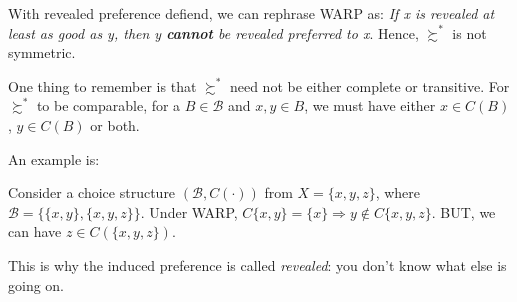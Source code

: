 With revealed preference defiend, we can rephrase WARP as: \textit{If x is revealed at least as good as y, then y \textbf{cannot} be revealed preferred to x}. Hence, $\succsim^*$ is not symmetric.

One thing to remember is that $\succsim^*$ need not be either complete or transitive. For $\succsim^*$ to be comparable, for a $B\in\mathcal{B}$ and $x,y\in B$, we must have either $x\in C(B)$, $y\in C(B)$ or both.

An example is:
\begin{example}
    Consider a choice structure $(\mathcal{B},C(\cdot))$ from $X=\{x,y,z\}$, where $\mathcal{B}=\{\{x,y\},\{x,y,z\}\}$. Under WARP, $C\{x,y\}=\{x\}\Rightarrow y\notin C\{x,y,z\}$.
    BUT, we can have $z\in C(\{x,y,z\})$.
\end{example}

This is why the induced preference is called \textit{revealed}: you don't know what else is going on.